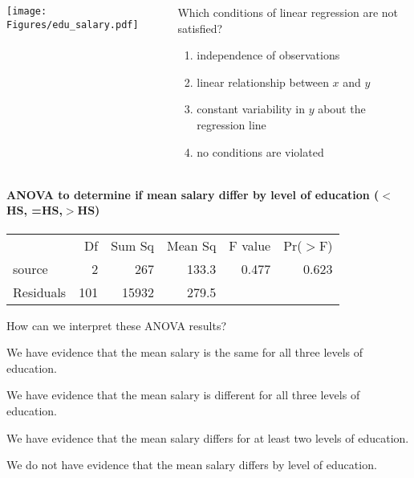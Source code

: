 \begin{frame}
\begin{columns}
\texttt{[image: Figures/edu\_salary.pdf]}
\begin{clicker}{Which conditions of linear regression are not satisfied?}
\begin{enumerate}
    \item
    independence of observations
    \item
    linear relationship between $x$ and $y$
    \item
    constant variability in $y$ about the regression line
    \item
    no conditions are violated
\end{enumerate}
\end{clicker}
\end{columns}
\end{frame}

\begin{frame}
\framesubtitle{ANOVA to determine if mean salary differ by level of education ($<$HS, =HS,$>$HS)}
\begin{tabular}{lrrrrr}
            & Df & Sum Sq & Mean Sq & F value & Pr($>$F) \\
    source  &      2  &   267  &  133.3 &   0.477 &   0.623 \\
    Residuals &   101&   15932  &  279.5   \\
\end{tabular}
\begin{clicker}{How can we interpret these ANOVA results?}
\begin{enumerate}
    \small{
    \item
    We have evidence that the mean salary is the same for all three levels of education.
    \item
    We have evidence that the mean salary is different for all three levels of education.
    \item
    We have evidence that the mean salary differs for at least two levels of education.
    \item
    We do not have evidence that the mean salary differs by level of education.}
\end{enumerate}
\end{clicker}
\end{frame}


